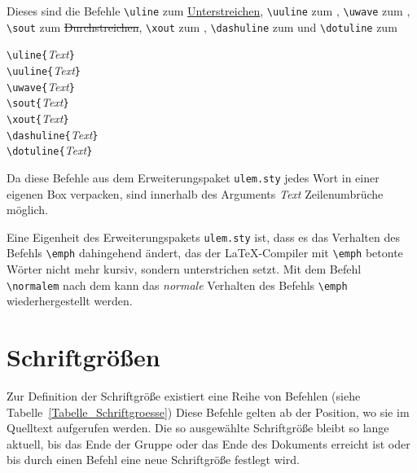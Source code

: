 Dieses sind die Befehle \verb!\uline!  
zum \uline{Unterstreichen}, \verb!\uuline!  
zum , \verb!\uwave!  
zum , \verb!\sout!  
zum \sout{Durchstreichen}, \verb!\xout!  
zum , \verb!\dashuline!  
zum   und \verb!\dotuline!  
zum  

\begin{boxedminipage}{\textwidth}
\texttt{\textbackslash uline\{}\textsl{Text}\texttt{\}} \\
\texttt{\textbackslash uuline\{}\textsl{Text}\texttt{\}} \\
\texttt{\textbackslash uwave\{}\textsl{Text}\texttt{\}} \\
\texttt{\textbackslash sout\{}\textsl{Text}\texttt{\}} \\
\texttt{\textbackslash xout\{}\textsl{Text}\texttt{\}} \\
\texttt{\textbackslash dashuline\{}\textsl{Text}\texttt{\}} \\
\texttt{\textbackslash dotuline\{}\textsl{Text}\texttt{\}} 
\end{boxedminipage}

Da diese Befehle aus dem Erweiterungspaket \verb!ulem.sty! jedes Wort in einer eigenen Box verpacken, sind innerhalb des  Arguments \textsl{Text} Zeilenumbrüche möglich.

Eine Eigenheit des Erweiterungspakets \verb!ulem.sty! ist, dass es das Verhalten des Befehls \verb!\emph! dahingehend ändert, das der \LaTeX-Compiler mit \verb!\emph! betonte Wörter nicht mehr kursiv, sondern unterstrichen setzt. Mit dem Befehl \verb!\normalem! nach dem \verb!! kann das \emph{normale} Verhalten des Befehls \verb!\emph! wiederhergestellt werden.

\section{Schriftgrößen}

Zur Definition der Schriftgröße existiert eine Reihe von Befehlen (siehe Tabelle~\ref{Tabelle_Schriftgroesse})
Diese Befehle gelten ab der Position, wo sie im Quelltext aufgerufen werden. Die so ausgewählte Schriftgröße bleibt so lange aktuell, bis das 
Ende der Gruppe oder das Ende des Dokuments erreicht ist oder bis durch einen Befehl
eine neue Schriftgröße festlegt wird.

